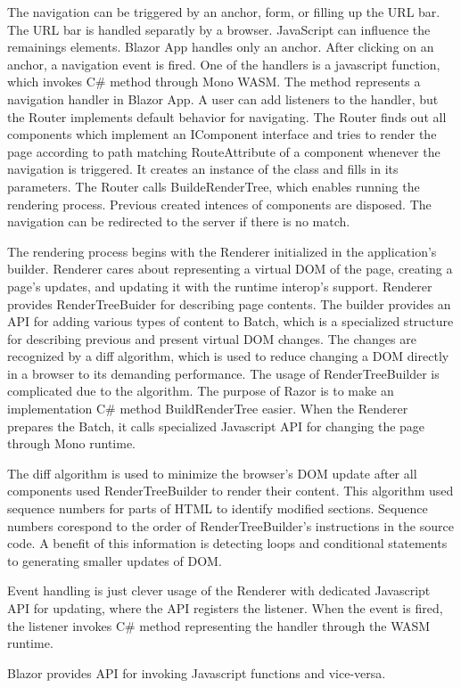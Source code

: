 The navigation  can be triggered by an anchor, form, or filling up the URL bar.
The URL bar is handled separatly by a browser.
JavaScript can influence the remainings elements.
Blazor App handles only an anchor.
After clicking on an anchor, a navigation event is fired.
One of the handlers is a javascript function, which invokes C\# method through Mono WASM. 
The method represents a navigation handler in Blazor App.
A user can add listeners to the handler, but the Router implements default behavior for navigating.
The Router finds out all components which implement an IComponent interface and tries to render the page according to path matching RouteAttribute of a component whenever the navigation is triggered.
It creates an instance of the class and fills in its parameters.
The Router calls BuildeRenderTree, which enables running the rendering process.
Previous created intences of components are disposed.
The navigation can be redirected to the server if there is no match.
\par
The rendering process begins with the Renderer initialized in the application's builder.
Renderer cares about representing a virtual DOM of the page, creating a page's updates, and updating it with the runtime interop's support.
Renderer provides RenderTreeBuider for describing page contents.
The builder provides an API for adding various types of content to Batch, which is a specialized structure for describing previous and present virtual DOM changes.
The changes are recognized by a diff algorithm, which is used to reduce changing a DOM directly in a browser to its demanding performance.
The usage of RenderTreeBuilder is complicated due to the algorithm.
The purpose of Razor is to make an implementation C\# method BuildRenderTree easier.
When the Renderer prepares the Batch, it calls specialized Javascript API for changing the page through Mono runtime.
\par
{}
The diff algorithm is used to minimize the browser's DOM  update after all components used RenderTreeBuilder to render their content.
This algorithm used sequence numbers for parts of HTML to identify modified sections.
Sequence numbers corespond to the order of RenderTreeBuilder's instructions in the source code.
A benefit of this information is detecting loops and conditional statements to generating smaller updates of DOM.  
\par
Event handling is just clever usage of the Renderer with dedicated Javascript API for updating, where the API registers the listener.
When the event is fired, the listener invokes C\# method representing the handler through the WASM runtime.
\par
{}
Blazor provides API for invoking Javascript functions and vice-versa.

